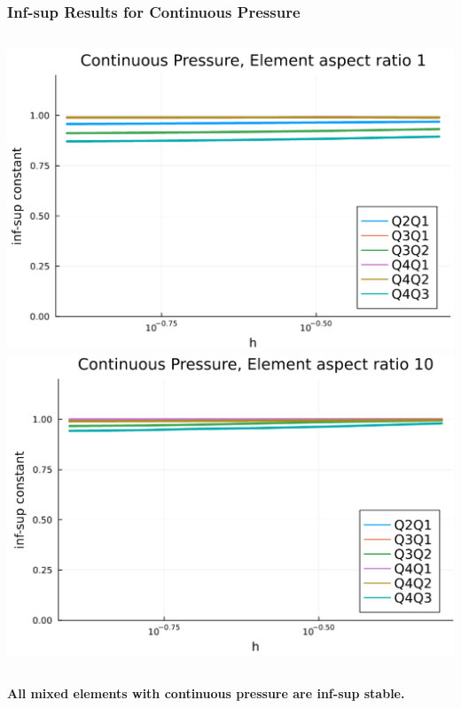\documentclass[aspectratio=169,xcolor=dvipsnames]{beamer}
\begin{document}
\begin{frame}
    \frametitle{Inf-sup Results for Continuous Pressure}
    \begin{columns}
        \centering
        \includegraphics[height =0.6\textheight]{figures/cont-p-1.png}
        \centering
        \includegraphics[height =0.6\textheight]{figures/cont-p-10.png}
    \end{columns}
\vspace*{10pt}
\textbf{ All mixed elements with continuous pressure are inf-sup stable.}
\end{frame}

\end{document}
